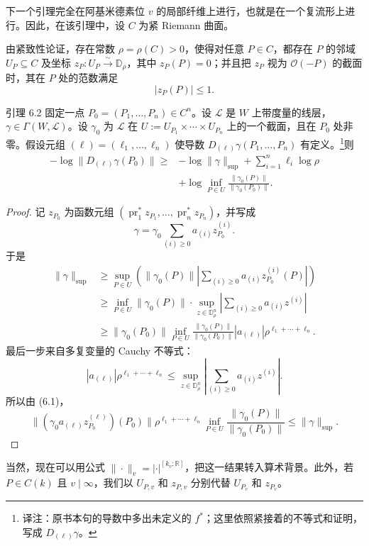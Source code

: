 下一个引理完全在阿基米德素位 $v$ 的局部纤维上进行，也就是在一个复流形上进行。因此，在该引理中，设 $C$ 为紧 Riemann 曲面。

由紧致性论证，存在常数 $\rho=\rho(C)>0$，使得对任意 $P\in C$，都存在 $P$ 的邻域 $U_P\subseteq C$ 及坐标 $z_P:U_P\xrightarrow\sim\mathbb D_\rho$，其中 $z_P(P)=0$；并且把 $z_P$ 视为 $\mathcal O(-P)$ 的截面时，其在 $P$ 处的范数满足
\begin{equation*}
|z_P(P)|\le1.\tag{6.1}
\end{equation*}
\begin{statement}{引理 6.2}
固定一点 $P_0=(P_1,\ldots,P_n)\in C^n$。设 $\mathscr L$ 是 $W$ 上带度量的线层，$\gamma\in\Gamma(W,\mathscr L)$。设 $\gamma_0$ 为 $\mathscr L$ 在 $U:=U_{P_1}\times\cdots\times U_{P_n}$ 上的一个截面，且在 $P_0$ 处非零。假设元组 $(\ell)=(\ell_1,\ldots,\ell_n)$ 使导数 $D_{(\ell)}\gamma(P_1,\ldots,P_n)$ 有定义。\footnote{译注：原书本句的导数中多出未定义的 $f^*$；这里依照紧接着的不等式和证明，写成 $D_{(\ell)}\gamma$。}则
\begin{align*}
-\log\|D_{(\ell)}\gamma(P_0)\|
\ge{}&-\log\|\gamma\|_{\mathrm{sup}}+\sum_{i=1}^n\ell_i\log\rho\\
&+\log\inf_{P\in U}\frac{\|\gamma_0(P)\|}{\|\gamma_0(P_0)\|}.
\end{align*}
\end{statement}
\begin{proof}
记 $z_{P_0}$ 为函数元组 $(\operatorname{pr}_1^*z_{P_1},\ldots,\operatorname{pr}_n^*z_{P_n})$，并写成
\[
\gamma=\gamma_0\sum_{(i)\ge0}a_{(i)}z_{P_0}^{(i)}.
\]
于是
\begin{align*}
\|\gamma\|_{\mathrm{sup}}
&\ge\sup_{P\in U}\left(\|\gamma_0(P)\|
\left|\sum_{(i)\ge0}a_{(i)}z_{P_0}^{(i)}(P)\right|\right)\\
&\ge\inf_{P\in U}\|\gamma_0(P)\|\cdot
\sup_{z\in\mathbb D_\rho^n}\left|\sum_{(i)\ge0}a_{(i)}z^{(i)}\right|\\
&\ge\|\gamma_0(P_0)\|\inf_{P\in U}
\frac{\|\gamma_0(P)\|}{\|\gamma_0(P_0)\|}
|a_{(\ell)}|\rho^{\ell_1+\cdots+\ell_n}.
\end{align*}
最后一步来自多复变量的 Cauchy 不等式：
\[
|a_{(\ell)}|\rho^{\ell_1+\cdots+\ell_n}
\le\sup_{z\in\mathbb D_\rho^n}\left|\sum_{(i)\ge0}a_{(i)}z^{(i)}\right|.
\]
所以由 (6.1)，
\[
\bigl\|(\gamma_0a_{(\ell)}z_{P_0}^{(\ell)})(P_0)\bigr\|
\rho^{\ell_1+\cdots+\ell_n}
\inf_{P\in U}\frac{\|\gamma_0(P)\|}{\|\gamma_0(P_0)\|}
\le\|\gamma\|_{\mathrm{sup}}.
\]
\end{proof}
当然，现在可以用公式 $\|\cdot\|_v=|\cdot|^{[k_v:\mathbb R]}$，把这一结果转入算术背景。此外，若 $P\in C(k)$ 且 $v\mid\infty$，我们以 $U_{P,v}$ 和 $z_{P,v}$ 分别代替 $U_{P_v}$ 和 $z_{P_v}$。
